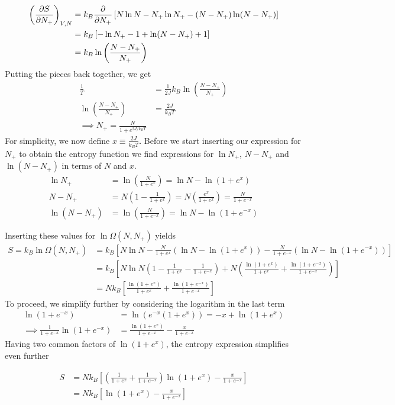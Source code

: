 \documentclass[reprint,english,notitlepage,aps,nobalancelastpage,nofootinbib]{revtex4-1}
\newcommand{\closed}[1]{\left(#1\right)}
\newcommand{\bracket}[1]{\left[#1\right]}
\newcommand{\tmdv}[4]{\closed{\pdv{#1}{#2}}_{#3,#4}}
\newcommand{\np}{N_+}
\newcommand{\kb}{k_B}
\begin{document}
\begin{align*}
	\tmdv{S}{\np}{V}{N} &= \kb \pdv{\np}\bracket{N\ln N - \np\ln\np - (N-\np)\ln(N-\np)} \\ 
	&= \kb \bracket{-\ln\np - 1 + \ln(N-\np) + 1} \\ 
	&= \kb\ln\closed{\frac{N-\np}{\np}}
\end{align*}
Putting the pieces back together, we get 
\begin{align}
	\frac{1}{T} &= \frac{1}{2J} \kb \ln\closed{\frac{N-\np}{\np}} \\ 
	\ln\closed{\frac{N-\np}{\np}} &=\frac{2J}{\kb T} \\ 
	\implies \np = \frac{N}{1+e^{2J/\kb T}} \label{eq:N_plus}
\end{align}
For simplicity, we now define $x\equiv \frac{2J}{\kb T}$. Before we start inserting our expression for $\np$ to obtain the entropy function we find expressions for $\ln\np$, $N-\np$ and $\ln(N-\np)$ in terms of $N$ and $x$. 
\begin{align*}
	\ln\np&=\ln\closed{\frac{N}{1+e^x}} = \ln N - \ln(1+e^x) \\ 
	N - \np &= N\closed{1 - \frac{1}{1+e^x}}=N\closed{\frac{e^x}{1+e^x}}=\frac{N}{1+e^{-x}} \\
	\ln(N-\np) &= \ln\closed{\frac{N}{1+e^{-x}}} = \ln N - \ln(1+e^{-x})
\end{align*}  

Inserting these values for $\ln\Omega(N,\np)$ yields 
\begin{align*}
	S=\kb \ln\Omega(N,\np) &= \kb \bracket{N\ln N - \frac{N}{1+e^x}\closed{\ln N - \ln(1+e^x)} - \frac{N}{1+e^{-x}} \closed{\ln N - \ln(1+e^{-x})}} \\ 
	&=\kb \bracket{N\ln N \closed{1 - \frac{1}{1+e^x} - \frac{1}{1+e^{-x}}} + N\closed{\frac{\ln(1+e^x)}{1+e^x} + \frac{\ln(1+e^{-x})}{1+e^{-x}}}} \\ 
	&= N\kb \bracket{\frac{\ln(1+e^x)}{1+e^x} + \frac{\ln(1+e^{-x})}{1+e^{-x}}}
\end{align*}
To proceed, we simplify further by considering the logarithm in the last term 
\begin{align*}
	\ln(1+e^{-x}) &= \ln(e^{-x}(1+e^x)) = -x + \ln(1+e^x) \\ 
	\implies \frac{1}{1+e^{-x}}\ln(1+e^{-x}) &= \frac{\ln(1+e^x)}{1+e^{-x}} - \frac{x}{1+e^{-x}}
\end{align*}
Having two common factors of $\ln(1+e^x)$, the entropy expression simplifies even further 

\begin{align*}
	S &= N\kb \bracket{\closed{\frac{1}{1+e^x} + \frac{1}{1+e^{-x}}}\ln(1+e^x) - \frac{x}{1+e^{-x}}} \\ 
	&= N\kb \bracket{\ln(1+e^x) - \frac{x}{1+e^{-x}}}
\end{align*}
\end{document}
